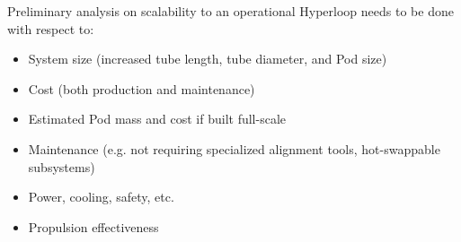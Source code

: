 \documentclass[main.tex]{subfiles}
\begin{document}
Preliminary analysis on scalability to an operational Hyperloop needs to be done with respect to:
\begin{itemize}
    \item System size (increased tube length, tube diameter, and Pod size)
    \item Cost (both production and maintenance)
    \item Estimated Pod mass and cost if built full-scale
    \item Maintenance (e.g. not requiring specialized alignment tools, hot-swappable subsystems)
    \item Power, cooling, safety, etc.
    \item Propulsion effectiveness
\end{itemize}
\end{document}

